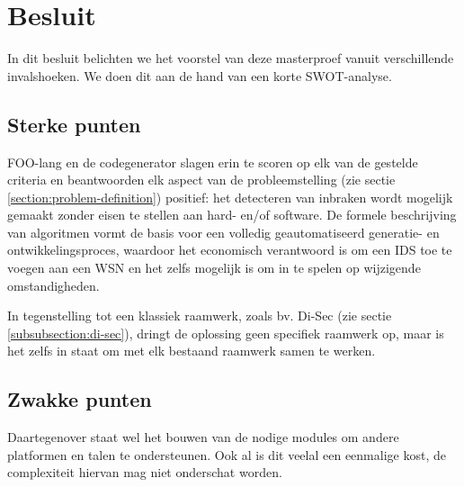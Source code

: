 \chapter{Besluit}
\label{besluit}


In dit besluit belichten we het voorstel van deze masterproef vanuit
verschillende invalshoeken. We doen dit aan de hand van een korte SWOT-analyse.

\section{Sterke punten}
\label{section:strenghts}

FOO-lang en de codegenerator slagen erin te scoren op elk van de gestelde
criteria en beantwoorden elk aspect van de probleemstelling (zie sectie
\ref{section:problem-definition}) positief: het detecteren van inbraken wordt
mogelijk gemaakt zonder eisen te stellen aan hard- en/of software. De formele
beschrijving van algoritmen vormt de basis voor een volledig geautomatiseerd
generatie- en ontwikkelingsproces, waardoor het economisch verantwoord is om
een IDS toe te voegen aan een WSN en het zelfs mogelijk is om in te spelen op
wijzigende omstandigheden.

In tegenstelling tot een klassiek raamwerk, zoals bv. Di-Sec (zie sectie
\ref{subsubsection:di-sec}), dringt de oplossing geen specifiek raamwerk op,
maar is het zelfs in staat om met elk bestaand raamwerk samen te werken.

\section{Zwakke punten}
\label{section:weaknesses}

Daartegenover staat wel het bouwen van de nodige modules om andere platformen
en talen te ondersteunen. Ook al is dit veelal een eenmalige kost, de
complexiteit hiervan mag niet onderschat worden.


